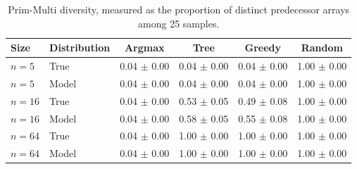 \begin{table}[hbt!]
    \centering
    \small
    \begin{tabular}{llcccc}
        \toprule
        \textbf{Size} & \textbf{Distribution} & \textbf{Argmax} & \textbf{Tree} & \textbf{Greedy} & \textbf{Random} \\
        \midrule
        $n=5$ & True & 0.04 $\pm$ 0.00 & 0.04 $\pm$ 0.00 & 0.04 $\pm$ 0.00 & 1.00 $\pm$ 0.00 \\
        $n=5$ & Model & 0.04 $\pm$ 0.00 & 0.04 $\pm$ 0.00 & 0.04 $\pm$ 0.00 & 1.00 $\pm$ 0.00 \\
        $n=16$ & True & 0.04 $\pm$ 0.00 & 0.53 $\pm$ 0.05 & 0.49 $\pm$ 0.08 & 1.00 $\pm$ 0.00 \\
        $n=16$ & Model & 0.04 $\pm$ 0.00 & 0.58 $\pm$ 0.05 & 0.55 $\pm$ 0.08 & 1.00 $\pm$ 0.00 \\
        $n=64$ & True & 0.04 $\pm$ 0.00 & 1.00 $\pm$ 0.00 & 1.00 $\pm$ 0.00 & 1.00 $\pm$ 0.00 \\
        $n=64$ & Model & 0.04 $\pm$ 0.00 & 1.00 $\pm$ 0.00 & 1.00 $\pm$ 0.00 & 1.00 $\pm$ 0.00 \\
        \bottomrule
    \end{tabular}
    \caption{Prim-Multi diversity, measured as the proportion of distinct predecessor arrays among 25 samples.}
    \label{tab:prim-diversity}
\end{table}

